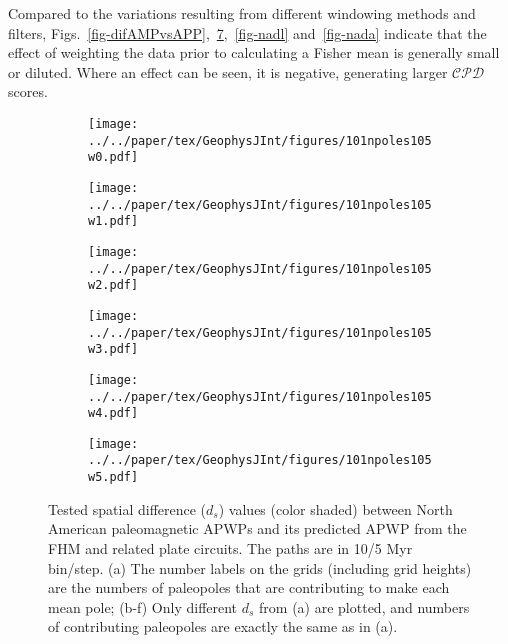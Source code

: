 Compared to the variations resulting from different windowing methods and
filters, Figs.~\ref{fig-difAMPvsAPP},~\ref{fig-nads},~\ref{fig-nadl}
and~\ref{fig-nada} indicate that the effect of weighting the data prior to
calculating a Fisher mean is generally small or diluted. Where an effect can be
seen, it is negative, generating larger $\mathcal{CPD}$ scores.

\begin{figure}[!ht]
  \captionsetup[subfigure]{singlelinecheck=off,justification=raggedright,aboveskip=-6pt,belowskip=-6pt}
  \centering
  \begin{subfigure}{.495\textwidth}
    \texttt{[image: ../../paper/tex/GeophysJInt/figures/101npoles105w0.pdf]}
    \caption{}\label{fig-na-dsw0}
  \end{subfigure}
  \vspace{.1em}
  \begin{subfigure}{.495\textwidth}
    \texttt{[image: ../../paper/tex/GeophysJInt/figures/101npoles105w1.pdf]}
    \caption{}\label{fig-na-dsw1}
  \end{subfigure}
  \vspace{.1em}
  \begin{subfigure}{.495\textwidth}
    \texttt{[image: ../../paper/tex/GeophysJInt/figures/101npoles105w2.pdf]}
    \caption{}\label{fig-na-dsw2}
  \end{subfigure}
  \vspace{.1em}
  \begin{subfigure}{.495\textwidth}
    \texttt{[image: ../../paper/tex/GeophysJInt/figures/101npoles105w3.pdf]}
    \caption{}\label{fig-na-dsw3}
  \end{subfigure}
  \vspace{.1em}
  \begin{subfigure}{.495\textwidth}
    \texttt{[image: ../../paper/tex/GeophysJInt/figures/101npoles105w4.pdf]}
    \caption{}\label{fig-na-dsw4}
  \end{subfigure}
  \vspace{.1em}
  \begin{subfigure}{.495\textwidth}
    \texttt{[image: ../../paper/tex/GeophysJInt/figures/101npoles105w5.pdf]}
    \caption{}\label{fig-na-dsw5}
  \end{subfigure}
  \caption[$d_s$ of each pair of poles for North American 10/5 Myr APWPs]{Tested
    spatial difference ($d_s$) values (color shaded) between North American
    paleomagnetic APWPs and its predicted APWP from the FHM and related plate
    circuits. The paths are in 10/5 Myr bin/step. (a) The number labels on the
    grids (including grid heights) are the numbers of paleopoles that are
    contributing to make each mean pole; (b-f) Only different $d_s$ from (a) are
    plotted, and numbers of contributing paleopoles are exactly the same as in
    (a).}\label{fig-nads}
\end{figure}

